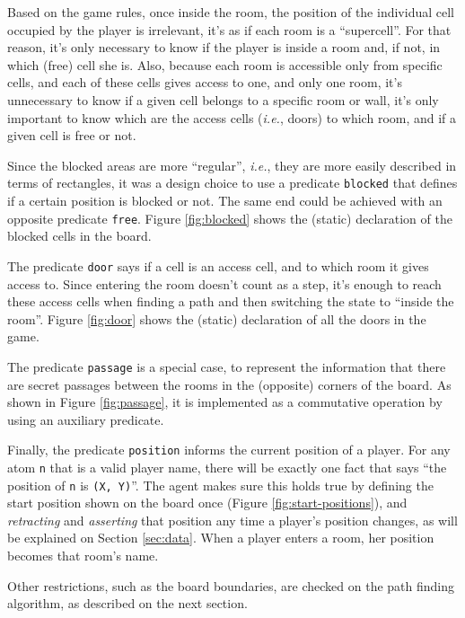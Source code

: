 \documentclass[12pt,a4paper]{article}
\newcommand{\varname}[1]{\texttt{#1}}
\newcommand{\predname}[1]{{\color{MidnightBlue}\varname{#1}}}
\begin{document}
Based on the game rules, once inside the room, the position of the individual cell occupied by the player is irrelevant, it's as if each room is a ``supercell''. For that reason, it's only necessary to know if the player is inside a room and, if not, in which (free) cell she is. Also, because each room is accessible only from specific cells, and each of these cells gives access to one, and only one room, it's unnecessary to know if a given cell belongs to a specific room or wall, it's only important to know which are the access cells (\textit{i.e.}, doors) to which room, and if a given cell is free or not.

Since the blocked areas are more ``regular'', \textit{i.e.}, they are more easily described in terms of rectangles, it was a design choice to use a predicate \predname{blocked} that defines if a certain position is blocked or not. The same end could be achieved with an opposite predicate \predname{free}. Figure \ref{fig:blocked} shows the (static) declaration of the blocked cells in the board.

The predicate \predname{door} says if a cell is an access cell, and to which room it gives access to. Since entering the room doesn't count as a step, it's enough to reach these access cells when finding a path and then switching the state to ``inside the room''. Figure \ref{fig:door} shows the (static) declaration of all the doors in the game.

The predicate \predname{passage} is a special case, to represent the information that there are secret passages between the rooms in the (opposite) corners of the board. As shown in Figure \ref{fig:passage}, it is implemented as a commutative operation by using an auxiliary predicate.

Finally, the predicate \predname{position} informs the current position of a player. For any atom \varname{n} that is a valid player name, there will be exactly one fact that says ``the position of \varname{n} is \varname{(X, Y)}''. The agent makes sure this holds true by defining the start position shown on the board once (Figure \ref{fig:start-positions}), and \textit{retracting} and \textit{asserting} that position any time a player's position changes, as will be explained on Section \ref{sec:data}. When a player enters a room, her position becomes that room's name.

Other restrictions, such as the board boundaries, are checked on the path finding algorithm, as described on the next section.
\end{document}

